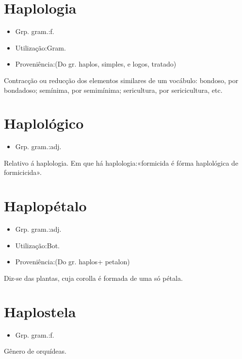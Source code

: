 \documentclass{article}
\begin{document}
\section{Haplologia}
\begin{itemize}
\item {Grp. gram.:f.}
\end{itemize}
\begin{itemize}
\item {Utilização:Gram.}
\end{itemize}
\begin{itemize}
\item {Proveniência:(Do gr. \textunderscore haplos\textunderscore , simples, e \textunderscore logos\textunderscore , tratado)}
\end{itemize}
Contracção ou reducção dos elementos similares de um vocábulo: \textunderscore bondoso\textunderscore , por \textunderscore bondadoso\textunderscore ; \textunderscore semínima\textunderscore , por \textunderscore semimínima\textunderscore ; \textunderscore sericultura\textunderscore , por \textunderscore sericicultura\textunderscore , etc.
\section{Haplológico}
\begin{itemize}
\item {Grp. gram.:adj.}
\end{itemize}
Relativo á haplologia.
Em que há haplologia:«\textunderscore formicida é fórma haplológica de formicicida\textunderscore ».
\section{Haplopétalo}
\begin{itemize}
\item {Grp. gram.:adj.}
\end{itemize}
\begin{itemize}
\item {Utilização:Bot.}
\end{itemize}
\begin{itemize}
\item {Proveniência:(Do gr. \textunderscore haplos\textunderscore  + \textunderscore petalon\textunderscore )}
\end{itemize}
Diz-se das plantas, cuja corolla é formada de uma só pétala.
\section{Haplostela}
\begin{itemize}
\item {Grp. gram.:f.}
\end{itemize}
Gênero de orquídeas.
\end{document}
